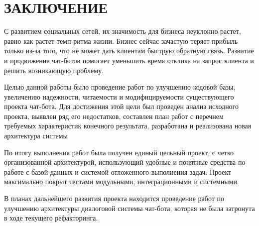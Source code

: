 \section*{ЗАКЛЮЧЕНИЕ}
    С развитием социальных сетей, их значимость для бизнеса неуклонно растет,
    равно как растет темп ритма жизни. Бизнес сейчас зачастую теряет прибыль
    только из-за того, что не может дать клиентам быструю обратную связь.
    Развитие и продвижение чат-ботов помогает уменьшить время отклика на запрос
    клиента и решить возникающую проблему.

    Целью данной работы было проведение работ по улучшению кодовой базы,
    увеличению надежности, читаемости и модифицируемости существующего проекта чат-бота.
    Для достижения этой цели был проведен анализ исходного проекта, выявлен ряд
    его недостатков, составлен план работ с перечнем требуемых характеристик конечного
    результата, разработана и реализована новая архитектура системы

    По итогу выполнения работ была получен единый цельный проект, с четко
    организованной архитектурой,
    использующий удобные и понятные средства по работе с базой данных
    и системой отложенного выполнения задач.
    Проект максимально покрыт тестами модульными, интеграционными и системными.

    В планах дальнейшего развития проекта находится проведение работ по улучшению
    архитектуры диалоговой системы чат-бота, которая не была затронута в ходе
    текущего рефакторинга.

